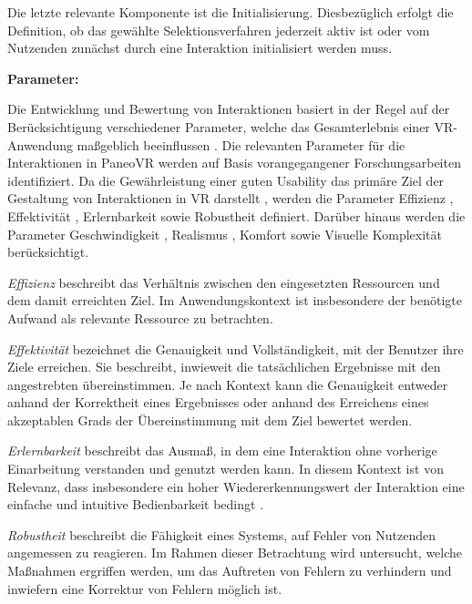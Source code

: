 Die letzte relevante Komponente ist die Initialisierung. Diesbezüglich erfolgt die Definition, ob das gewählte Selektionsverfahren jederzeit aktiv ist oder vom Nutzenden zunächst durch eine Interaktion initialisiert werden muss. 

{\normalfont \bfseries Parameter:} 

Die Entwicklung und Bewertung von Interaktionen basiert in der Regel auf der Berücksichtigung verschiedener Parameter, welche das Gesamterlebnis einer VR-Anwendung maßgeblich beeinflussen \citep{10.1145/3441852.3471230}. Die relevanten Parameter für die Interaktionen in PaneoVR werden auf Basis vorangegangener Forschungsarbeiten identifiziert. Da die Gewährleistung einer guten Usability das primäre Ziel der Gestaltung von Interaktionen in VR darstellt \citep{dorner_virtual_2019}, werden die Parameter Effizienz \citep{DINISO9241-11}, Effektivität \citep{DINISO9241-11}, Erlernbarkeit \citep{DINISO9241-110} sowie Robustheit \citep{DINISO9241-110} definiert. Darüber hinaus werden die Parameter Geschwindigkeit \citep{COOK2015117}, Realismus \citep{jerald_vr_2016}, Komfort \citep{jerald_vr_2016} sowie Visuelle Komplexität \citep{steriadis_designing_2003} berücksichtigt. 

\textit{Effizienz} beschreibt das Verhältnis zwischen den eingesetzten Ressourcen und dem damit erreichten Ziel. Im Anwendungskontext ist  insbesondere der benötigte Aufwand als relevante Ressource zu betrachten.

\textit{Effektivität} bezeichnet die Genauigkeit und Vollständigkeit, mit der Benutzer ihre Ziele erreichen. Sie beschreibt, inwieweit die tatsächlichen Ergebnisse mit den angestrebten übereinstimmen. Je nach Kontext kann die Genauigkeit entweder anhand der Korrektheit eines Ergebnisses oder anhand des Erreichens eines akzeptablen Grads der Übereinstimmung mit dem Ziel bewertet werden.

\textit{Erlernbarkeit} beschreibt das Ausmaß, in dem eine Interaktion ohne vorherige Einarbeitung verstanden und genutzt werden kann. In diesem Kontext ist von Relevanz, dass insbesondere ein hoher Wiedererkennungswert der Interaktion eine einfache und intuitive Bedienbarkeit bedingt \citep{jerald_vr_2016}.

\textit{Robustheit} beschreibt die Fähigkeit eines Systems, auf Fehler von Nutzenden angemessen zu reagieren. Im Rahmen dieser Betrachtung wird untersucht, welche Maßnahmen ergriffen werden, um das Auftreten von Fehlern zu verhindern und inwiefern eine Korrektur von Fehlern möglich ist.

